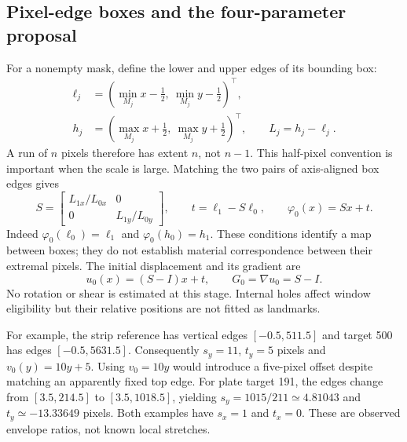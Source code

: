 \subsection{Pixel-edge boxes and the four-parameter proposal}
For a nonempty mask, define the lower and upper edges of its bounding box:
\begin{align}
 \ell_j&=(\min_{M_j}x-\tfrac12,\ \min_{M_j}y-\tfrac12)^\top,\\
 h_j&=(\max_{M_j}x+\tfrac12,\ \max_{M_j}y+\tfrac12)^\top,
 \qquad L_j=h_j-\ell_j.
\end{align}
A run of $n$ pixels therefore has extent $n$, not $n-1$. This half-pixel
convention is important when the scale is large. Matching the two pairs of
axis-aligned box edges gives
\begin{equation}
 S=\begin{bmatrix}L_{1x}/L_{0x}&0\\0&L_{1y}/L_{0y}\end{bmatrix},
 \qquad t=\ell_1-S\ell_0,\qquad \varphi_0(x)=Sx+t.
 \label{eq:silhouette-map}
\end{equation}
Indeed $\varphi_0(\ell_0)=\ell_1$ and $\varphi_0(h_0)=h_1$.
These conditions identify a map between boxes; they do not establish material
correspondence between their extremal pixels. The initial displacement and
its gradient are
\begin{equation}
 u_0(x)=(S-I)x+t,\qquad G_0=\nabla u_0=S-I.
\end{equation}
No rotation or shear is estimated at this stage. Internal holes affect window
eligibility but their relative positions are not fitted as landmarks.

For example, the strip reference has vertical edges $[-0.5,511.5]$ and target
500 has edges $[-0.5,5631.5]$. Consequently $s_y=11$, $t_y=5$ pixels and
$v_0(y)=10y+5$. Using $v_0=10y$ would introduce a five-pixel offset despite
matching an apparently fixed top edge. For plate target 191, the edges change
from $[3.5,214.5]$ to $[3.5,1018.5]$, yielding
$s_y=1015/211\simeq4.81043$ and $t_y\simeq-13.33649$ pixels.
Both examples have $s_x=1$ and $t_x=0$. These are observed envelope ratios,
not known local stretches.

